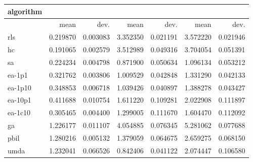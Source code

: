 \begin{tabular}{@{}l*{6}{>{{}}N{1}{2}}@{}}
\toprule
{algorithm} &  &  &  \\
\midrule
& {mean} & {dev.} & {mean} & {dev.} & {mean} & {dev.} \\
\midrule
rls & 0.219870 & 0.003083 & 3.352350 & 0.021191 & 3.572220 & 0.021946 \\
 hc & 0.191065 & 0.002579 & 3.512989 & 0.049316 & 3.704054 & 0.051391 \\
 sa & 0.224234 & 0.004798 & 0.871900 & 0.050634 & 1.096134 & 0.053212 \\
 ea-1p1 & 0.321762 & 0.003806 & 1.009529 & 0.042848 & 1.331290 & 0.042133 \\
 ea-1p10 & 0.348853 & 0.006718 & 1.039426 & 0.040897 & 1.388278 & 0.043427 \\
 ea-10p1 & 0.411688 & 0.010754 & 1.611220 & 0.109281 & 2.022908 & 0.111897 \\
 ea-1c10 & 0.305465 & 0.004400 & 1.299005 & 0.111670 & 1.604470 & 0.112092 \\
 ga & 1.226177 & 0.011107 & 4.054885 & 0.076345 & 5.281062 & 0.077688 \\
 pbil & 1.280216 & 0.005132 & 1.379059 & 0.064675 & 2.659275 & 0.068150 \\
 umda & 1.232041 & 0.066526 & 0.842406 & 0.041122 & 2.074447 & 0.106580 \\
 \bottomrule
\end{tabular}
